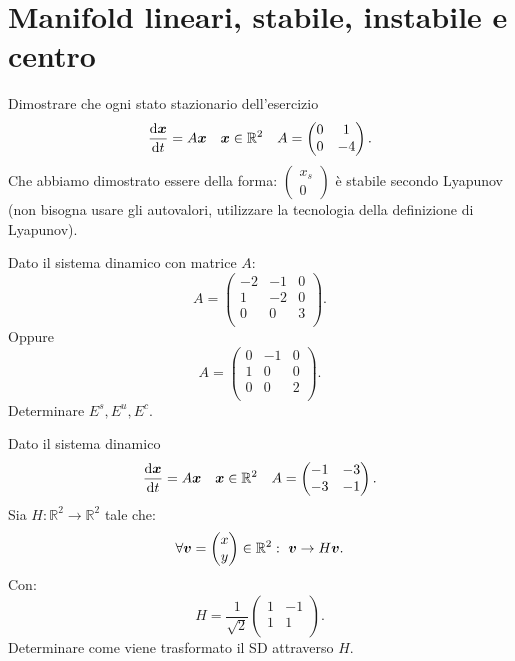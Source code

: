 \section{Manifold lineari, stabile, instabile e centro}%
\begin{ex}[]
    Dimostrare che ogni stato stazionario dell'esercizio
    \[
        \frac{\text{d} \boldsymbol{x}}{\text{d} t} = A \boldsymbol{x} \quad  \boldsymbol{x}\in \mathbb{R}^2 \quad
	A = 
    \begin{pmatrix}
	0  & 1 \\
	0 & -4 \\
    \end{pmatrix}
    .\] 
    Che abbiamo dimostrato essere della forma: $\begin{pmatrix} x_s \\ 0 \end{pmatrix} $ è stabile secondo Lyapunov (non bisogna usare gli autovalori, utilizzare la tecnologia della definizione di Lyapunov).
\end{ex}
\noindent
\begin{ex}[]
    Dato il sistema dinamico con matrice $A$:
    \[
        A = 
    \begin{pmatrix}
	-2 & -1 & 0 \\
	1 & -2 & 0 \\
	0 & 0 & 3 \\
    \end{pmatrix}
    .\] 
    Oppure 
    \[
        A = 
    \begin{pmatrix}
	0 & -1 & 0 \\
	1 & 0 & 0 \\
	0 & 0 & 2 \\
    \end{pmatrix}
    .\] 
    Determinare $E^s, E^u, E^c$.
\end{ex}
\noindent
\begin{ex}[]
    Dato il sistema dinamico 
     \[
        \frac{\text{d} \boldsymbol{x}}{\text{d} t} = A \boldsymbol{x} \quad  \boldsymbol{x}\in \mathbb{R}^2 \quad  A = 
    \begin{pmatrix}
	-1 & -3 \\
	-3 & -1 \\
    \end{pmatrix}
    .\] 
    Sia $H:\mathbb{R}^2\to \mathbb{R}^2 $  tale che:
    \[
        \forall \boldsymbol{v} = \begin{pmatrix} x \\ y \end{pmatrix} \in \mathbb{R}^2: \ \boldsymbol{v}\to H\boldsymbol{v}
    .\] 
    Con:
    \[
        H = \frac{1}{\sqrt{2} } 
    \begin{pmatrix}
	1 & -1 \\
	1 & 1 \\
    \end{pmatrix}
    .\]  
    Determinare come viene trasformato il SD attraverso $H$.
\end{ex}
\noindent
